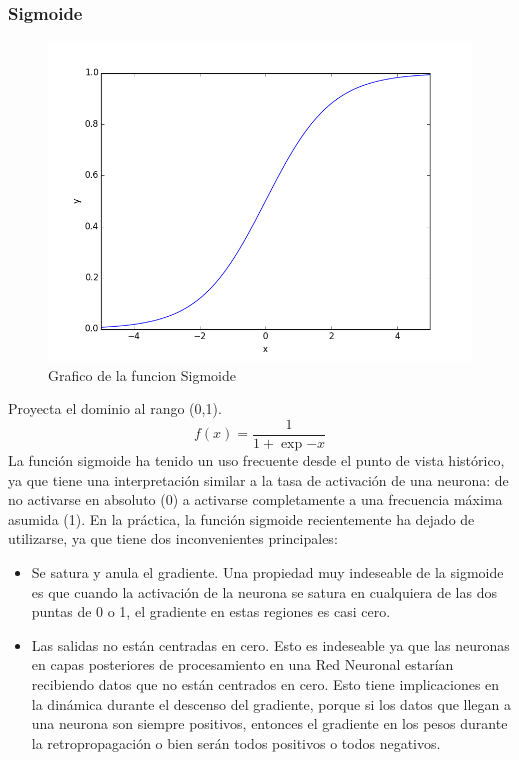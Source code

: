 \documentclass[a4paper,11pt,spanish]{book}
\begin{document}
	  \subsubsection {Sigmoide} 
	    \begin{figure}[h]
	      \includegraphics[scale=0.5]{./img/sigmoid.png}
	      \caption{Grafico de la funcion Sigmoide}
	      \label{fig:sigmoid}
	    \end{figure}
	    Proyecta el dominio al rango (0,1). 
	    \begin{equation}
	     f(x) = \frac{1}{1+\exp{-x}}
	    \end{equation}
	    La función sigmoide ha tenido un uso frecuente desde el punto de vista histórico, ya que tiene una interpretación similar a la tasa de activación de una neurona: 
	    de no activarse en absoluto (0) a activarse completamente a una frecuencia máxima asumida (1). En la práctica, la función sigmoide recientemente ha dejado de utilizarse, 
	    ya  que tiene dos inconvenientes principales:
	    \begin{itemize}
	     \item Se satura y anula el gradiente. Una propiedad muy indeseable de la sigmoide es que cuando la activación de la neurona se satura en cualquiera de las dos puntas de 0 o 1, 
	      el gradiente en estas regiones es casi cero.
	     \item Las salidas no están centradas en cero. Esto es indeseable ya que las neuronas en capas posteriores de procesamiento en una Red Neuronal estarían recibiendo 
	      datos que no están centrados en cero. Esto tiene implicaciones en la dinámica durante el descenso del gradiente, porque si los datos que llegan a una neurona 
	      son siempre positivos, entonces el gradiente en los pesos durante la retropropagación o bien serán todos positivos o todos negativos.
	    \end{itemize}
\end{document}
